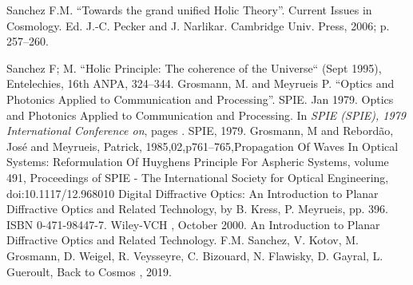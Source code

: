 \documentclass[a4paper,9pt]{article}
\begin{document}
\begin{thebibliography}{1}

 Sanchez F.M. ``Towards the grand unified Holic Theory''. Current
Issues in Cosmology. Ed. J.-C. Pecker and J. Narlikar. Cambridge Univ. Press,
2006; p. 257--260.

 Sanchez F; M. ``Holic Principle: The coherence of the Universe`` (Sept 1995), Entelechies, 16th ANPA, 324--344.
 Grosmann, M. and Meyrueis P. ``Optics and Photonics Applied to Communication and Processing''. SPIE.  Jan 1979.
\newblock Optics and Photonics Applied to Communication and Processing.
\newblock In {\em SPIE (SPIE), 1979 
  International Conference on}, pages . SPIE, 1979.
 Grosmann, M and Rebordão, José and Meyrueis, Patrick, 1985,02,p761--765,Propagation Of Waves In Optical Systems: Reformulation Of Huyghens Principle For Aspheric Systems,
volume 491, Proceedings of SPIE - The International Society for Optical Engineering, doi:10.1117/12.968010
 Digital Diffractive Optics: An Introduction to Planar Diffractive Optics and Related Technology, by B. Kress, P. Meyrueis, pp. 396. ISBN 0-471-98447-7. Wiley-VCH , October 2000.
\newblock An Introduction to Planar Diffractive Optics and Related Technology.
 F.M. Sanchez, V. Kotov, M. Grosmann, D. Weigel, R. Veysseyre, C. Bizouard, N. Flawisky, D. Gayral, L. Gueroult, Back to Cosmos
, 2019.
\end{thebibliography}
\end{document}
